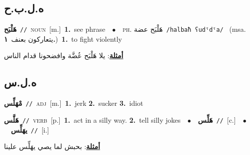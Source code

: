 \documentclass[10pt,a4paper,twoside]{article} %
\begin{document}
\begin{multicols}{2}
\vspace{-3mm}
\subsection*{\color{blue}\foreignlanguage{arabic}{ه.ل.ب.ح}\color{blue}{ (ntws)}} 

{\setlength\topsep{0pt}\textbf{\foreignlanguage{arabic}{هَلْبَح}}\ {\color{gray}\texttt{//}\color{black}}\ \textsc{noun}\ [m.]\ \textbf{1.}~see phrase\ \ $\bullet$\ \ \textsc{ph.} \color{gray} \foreignlanguage{arabic}{هَلْبَح عضة}\color{black}\ {\color{gray}\texttt{/{\sffamily halbaħ ʕudˤdˤa}/}\color{black}}\ \color{gray} (msa. \foreignlanguage{arabic}{يتعاركون بعنف}~\foreignlanguage{arabic}{\textbf{١.}})\color{black}\ \textbf{1.}~to fight violently\  \begin{flushright}\color{gray}\foreignlanguage{arabic}{\textbf{\underline{\foreignlanguage{arabic}{أمثلة}}}: يلا هَلْبَح عُضَّة وافضحونا قدام الناس}\end{flushright}\color{black}} \vspace{2mm}

\vspace{-3mm}
\subsection*{\color{blue}\foreignlanguage{arabic}{ه.ل.س}\color{blue}{}} 

{\setlength\topsep{0pt}\textbf{\foreignlanguage{arabic}{مْهَلِّس}}\ {\color{gray}\texttt{//}\color{black}}\ \textsc{adj}\ [m.]\ \textbf{1.}~jerk  \textbf{2.}~sucker  \textbf{3.}~idiot\ } \vspace{2mm}

{\setlength\topsep{0pt}\textbf{\foreignlanguage{arabic}{هَلَّس}}\ {\color{gray}\texttt{//}\color{black}}\ \textsc{verb}\ [p.]\ \textbf{1.}~act in a silly way.  \textbf{2.}~tell silly jokes\ \ $\bullet$\ \ \setlength\topsep{0pt}\textbf{\foreignlanguage{arabic}{هَلِّس}}\ {\color{gray}\texttt{//}\color{black}}\ [c.]\ \ $\bullet$\ \ \setlength\topsep{0pt}\textbf{\foreignlanguage{arabic}{يهَلِّس}}\ {\color{gray}\texttt{//}\color{black}}\ [i.]\  \begin{flushright}\color{gray}\foreignlanguage{arabic}{\textbf{\underline{\foreignlanguage{arabic}{أمثلة}}}: بحبش لما يصي يهَلِّس علينا}\end{flushright}\color{black}} \vspace{2mm}


\end{multicols}
\end{document}
